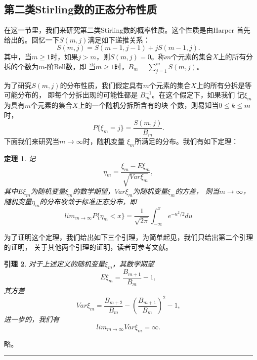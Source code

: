 \documentclass[a4paper,11pt,twoside]{book}
\newtheorem{thm}{定理}[section]
\newtheorem{lem}[thm]{引理}
\def\qed{\nopagebreak\hfill{\rule{4pt}{7pt}}\medbreak}
\begin{document}
\subsection{第二类Stirling数的正态分布性质}

在这一节里，我们来研究第二类Stirling数的概率性质。这个性质是由Harper\cite{Harper1967}
首先给出的。回忆一下$S(m,j)$满足如下递推关系：
\begin{equation}\label{St}
S(m,j)=S(m-1,j-1)+jS(m-1,j).
\end{equation}
其中，当$m\geq
1$时，如果$j>m$，则$S(m,j)=0$。称$m$个元素的集合$X$上的所有分拆的个数为$m$-阶Bell数，即
当$m\geq 1$时，$B_m=\sum\limits_{j=1}^{m}S(m,j)$。


为了研究$S(m,j)$的分布性质，我们假定具有$m$个元素的集合$X$上的所有分拆是等可能分布的，
即每个分拆出现的可能性都是 $B_m^{-1}$。在这个假定下，如果我们
记$\xi_m$为具有$m$个元素的集合$X$上的一个随机分拆所含有的块
个数，则易知当$0\leq k\leq m$时，
\begin{equation}\label{xik}
P\{\xi_m=j\}=\frac{S(m,j)}{B_m}.
\end{equation}
下面我们来研究当$m\rightarrow \infty$时，随机变量
$\xi_m$所满足的分布。我们有如下定理：

\begin{thm}\label{secstirling}
记
\begin{equation}
\eta_m=\frac{\xi_m-E\xi_m}{\sqrt {Var\xi_m}},
\end{equation}
其中$E\xi_m$为随机变量$\xi_m$的数学期望，$Var\xi_m$为随机变量$\xi_m$的方差，
则当$m\rightarrow
\infty$，随机变量$\eta_m$的分布收敛于标准正态分布，即
\[
lim_{m\rightarrow \infty}P\{\eta_m
<x\}=\frac{1}{\sqrt{2\pi}}\int_{-\infty}^{x}e^{-u^2/2}du
\]
\end{thm}

为了证明这个定理，我们给出如下三个引理，为简单起见，我们只给出第二个引理的证明，
关于其他两个引理的证明，读者可参考文献\cite{Sachkov1997}。
\begin{lem}\label{EVar}
对于上述定义的随机变量$\xi_m$，其数学期望
\begin{equation}
E\xi_m=\frac{B_{m+1}}{B_m}-1,
\end{equation}
其方差
\begin{equation}
Var\xi_m=\frac{B_{m+2}}{B_m}-(\frac{B_{m+1}}{B_m})^2-1,
\end{equation}
进一步的，我们有
\begin{equation}
lim_{m\rightarrow \infty}Var\xi_m=\infty.
\end{equation}
\end{lem}
 略。\qed
\end{document}
